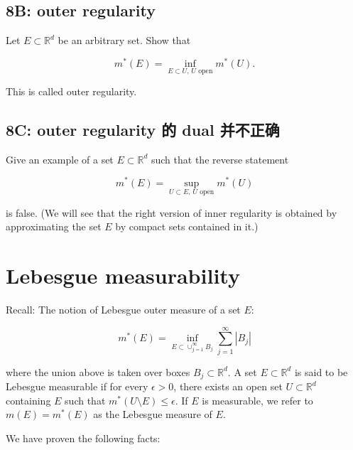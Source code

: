 \documentclass[lang=cn,11pt]{template}
\begin{document}
\section*{8B: outer regularity} 
Let $E \subset \mathbb{R}^d$ be an arbitrary set. Show that

\[
m^*(E) = \inf_{E \subset U, \, U \text{ open}} m^*(U).
\]

This is called outer regularity.

\section*{8C: outer regularity 的 dual 并不正确} 
Give an example of a set $E \subset \mathbb{R}^d$ such that the reverse statement

\[
m^*(E) = \sup_{U \subset E, \, U \text{ open}} m^*(U)
\]

is false. (We will see that the right version of inner regularity is obtained by approximating the set $E$ by compact sets contained in it.)


\newpage
\chapter{Lebesgue measurability}

Recall: The notion of Lebesgue outer measure of a set \( E \):

\[
m^*(E) = \inf_{E \subset \cup_{j=1}^{\infty} B_j} \sum_{j=1}^{\infty} |B_j|
\]

where the union above is taken over boxes \( B_j \subset \mathbb{R}^d \). A set \( E \subset \mathbb{R}^d \) is said to be Lebesgue measurable if for every \( \epsilon > 0 \), there exists an open set \( U \subset \mathbb{R}^d \) containing \( E \) such that \( m^*(U \setminus E) \leq \epsilon \). If \( E \) is measurable, we refer to \( m(E) = m^*(E) \) as the Lebesgue measure of \( E \).

We have proven the following facts:
\end{document}
